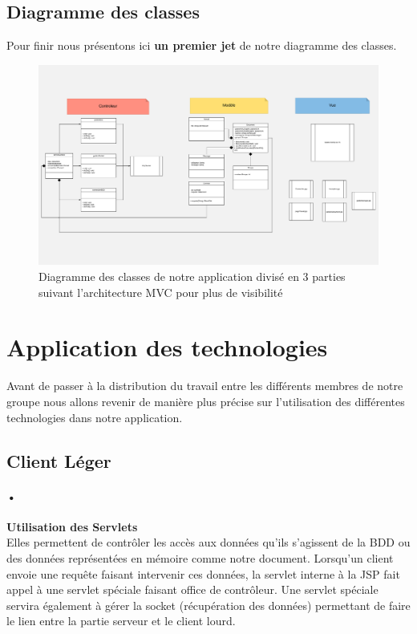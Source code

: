 \documentclass[11pt,a4paper]{article}
\begin{document}
\subsection{Diagramme des classes}
Pour finir nous présentons ici \textbf{un premier jet} de notre diagramme des classes.
\begin{figure}[!h]
\centering
\includegraphics[angle=0, scale=0.3]{Image/Class_Diagram_dev2.pdf}
\caption{Diagramme des classes de notre application divisé en 3 parties suivant l'architecture MVC pour plus de visibilité}
\end{figure}
\section{Application des technologies}
Avant de passer à la distribution du travail entre les différents membres de notre groupe nous allons revenir de manière plus précise sur l'utilisation des différentes technologies dans notre application.
\subsection{Client Léger}
\paragraph{•}
\textbf{Utilisation des Servlets}\\
Elles permettent de contrôler les accès aux données qu'ils s'agissent de la BDD ou des données représentées en mémoire comme notre document. Lorsqu'un client envoie une requête faisant intervenir ces données, la servlet interne à la JSP fait appel à une servlet spéciale faisant office de contrôleur. Une servlet spéciale servira également à gérer la socket (récupération des données) permettant de faire le lien entre la partie serveur et le client lourd.
\end{document}
